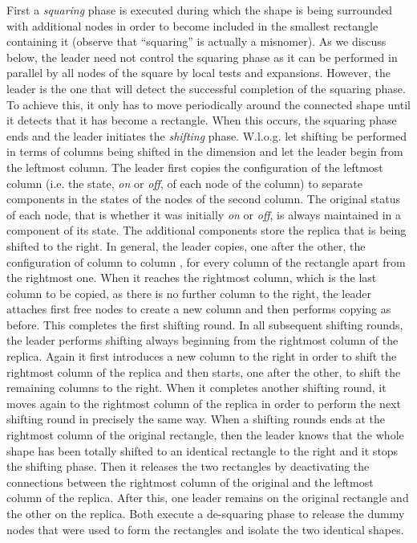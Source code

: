 \documentclass[oribibl, 11pt]{llncs}
\begin{document}
First a \emph{squaring} phase is executed during which the shape  is being surrounded with additional nodes in order to become included in the smallest rectangle  containing it (observe that ``squaring'' is actually a misnomer). As we discuss below, the leader need not control the squaring phase as it can be performed in parallel by all nodes of the square by local tests and expansions. However, the leader is the one that will detect the successful completion of the squaring phase. To achieve this, it only has to move periodically around the connected shape until it detects that it has become a rectangle. When this occurs, the squaring phase ends and the leader initiates the \emph{shifting} phase. W.l.o.g. let shifting be performed in terms of columns being shifted in the  dimension and let the leader begin from the leftmost column. The leader first copies the configuration of the leftmost column (i.e. the state, \emph{on} or \emph{off}, of each node of the column) to separate components in the states of the nodes of the second column. The original status of each node, that is whether it was initially \emph{on} or \emph{off}, is always maintained in a component of its state. The additional components store the replica that is being shifted to the right. In general, the leader copies, one after the other, the configuration of column  to column , for every column  of the rectangle  apart from the rightmost one. When it reaches the rightmost column, which is the last column to be copied, as there is no further column to the right, the leader attaches first free nodes to create a new column and then performs copying as before. This completes the first shifting round. In all subsequent shifting rounds, the leader performs shifting always beginning from the rightmost column of the replica. Again it first introduces a new column to the right in order to shift the rightmost column of the replica and then starts, one after the other, to shift the remaining columns to the right. When it completes another shifting round, it moves again to the rightmost column of the replica in order to perform the next shifting round in precisely the same way. When a shifting rounds ends at the rightmost column of the original rectangle, then the leader knows that the whole shape has been totally shifted to an identical rectangle to the right and it stops the shifting phase. Then it releases the two rectangles by deactivating the connections between the rightmost column of the original and the leftmost column of the replica. After this, one leader remains on the original rectangle and the other on the replica. Both execute a de-squaring phase to release the dummy nodes that were used to form the rectangles and isolate the two identical shapes.\\
\end{document}
